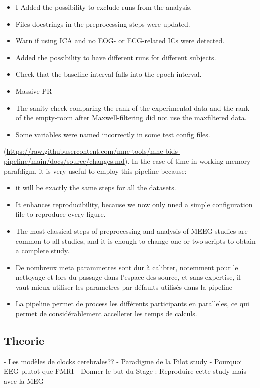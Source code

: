 \begin{itemize}
    \item I Added the possibility to exclude runs from the analysis.
    \item Files docstrings in the preprocessing steps were updated.
    \item Warn if using ICA and no EOG- or ECG-related ICs were detected.
    \item Added the possibility to have different runs for different subjects.
    \item Check that the baseline interval falls into the epoch interval.
    \item Massive PR
    \item The sanity check comparing the rank of the experimental data and the rank of the empty-room after Maxwell-filtering did not use the maxfiltered data.
    \item Some variables were named incorrectly in some test config files.
\end{itemize}

(\url{https://raw.githubusercontent.com/mne-tools/mne-bids-pipeline/main/docs/source/changes.md}).
In the case of time in working memory parafdigm, it is very useful to employ this pipeline because:
\begin{itemize}
    \item it will be exactly the same steps for all the datasets.
    \item It enhances reproducibility, because we now only nned a simple configuration file to reproduce every figure.
    \item The most classical steps of preprocessing and analysis of MEEG studies are common to all studies, and it is enough to change one or two scripts to obtain a complete study.
    \item De nombreux meta parammetres sont dur à calibrer, notemment pour le nettoyage et lors du passage dans l'espace des source, et sans expertise, il vaut mieux utiliser les parametres par défaults utilisés dans la pipeline
    \item La pipeline permet de process les différents participants en paralleles, ce qui permet de considérablement accellerer les temps de calculs.
\end{itemize}

\subsection{Theorie}
- Les modèles de clocks cerebrales??
- Paradigme de la Pilot study
- Pourquoi EEG plutot que FMRI
- Donner le but du Stage :
Reproduire cette study mais avec la MEG

